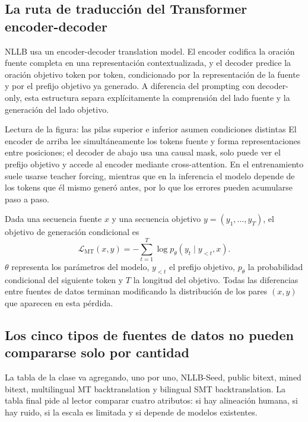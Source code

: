 \subsection{La ruta de traducción del Transformer encoder-decoder}

NLLB usa un encoder-decoder translation model. El encoder codifica la oración fuente completa en una representación contextualizada, y el decoder predice la oración objetivo token por token, condicionado por la representación de la fuente y por el prefijo objetivo ya generado. A diferencia del prompting con decoder-only, esta estructura separa explícitamente la comprensión del lado fuente y la generación del lado objetivo.


\begin{knowledgebox}{Lectura de la figura: las pilas superior e inferior asumen condiciones distintas}
El encoder de arriba lee simultáneamente los tokens fuente y forma representaciones entre posiciones; el decoder de abajo usa una causal mask, solo puede ver el prefijo objetivo y accede al encoder mediante cross-attention. En el entrenamiento suele usarse teacher forcing, mientras que en la inferencia el modelo depende de los tokens que él mismo generó antes, por lo que los errores pueden acumularse paso a paso.
\end{knowledgebox}

Dada una secuencia fuente $x$ y una secuencia objetivo $y=(y_1,\ldots,y_T)$, el objetivo de generación condicional es
\[
\mathcal{L}_{\text{MT}}(x,y)=-\sum_{t=1}^{T}\log p_\theta(y_t\mid y_{<t},x).
\]
$\theta$ representa los parámetros del modelo, $y_{<t}$ el prefijo objetivo, $p_\theta$ la probabilidad condicional del siguiente token y $T$ la longitud del objetivo. Todas las diferencias entre fuentes de datos terminan modificando la distribución de los pares $(x,y)$ que aparecen en esta pérdida.

\subsection{Los cinco tipos de fuentes de datos no pueden compararse solo por cantidad}

La tabla de la clase va agregando, uno por uno, NLLB-Seed, public bitext, mined bitext, multilingual MT backtranslation y bilingual SMT backtranslation. La tabla final pide al lector comparar cuatro atributos: si hay alineación humana, si hay ruido, si la escala es limitada y si depende de modelos existentes.


